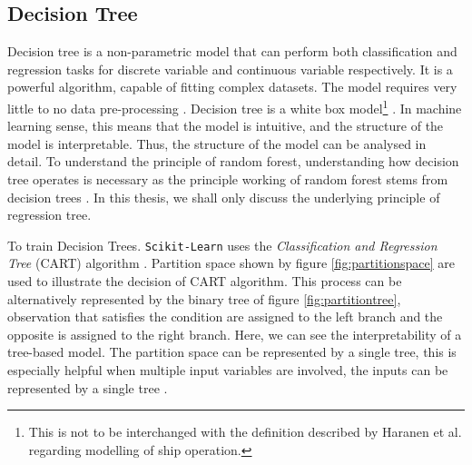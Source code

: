 \subsection{Decision Tree}\label{dt_theo}

Decision tree is a non-parametric model that can perform both classification and regression tasks for discrete variable and continuous variable respectively. It is a powerful algorithm, capable of fitting complex datasets. The model requires very little to no data pre-processing \cite{Geron.2019,Hastie.2009}. Decision tree is a white box model\footnote{This is not to be interchanged with the definition described by Haranen et al. \cite{MichaelHaranen.2016} regarding modelling of ship operation.} \cite{Geron.2019}. In machine learning sense, this means that the model is intuitive, and the structure of the model is interpretable. Thus, the structure of the model can be analysed in detail. To understand the principle of random forest, understanding how decision tree operates is necessary as the principle working of random forest stems from decision trees \cite{Geron.2019,Affenzeller.2020}. In this thesis, we shall only discuss the underlying principle of regression tree.\\  
\newpage

To train Decision Trees. {\tt Scikit-Learn} \cite{FabianPedregosa.2011} uses the \emph{Classification and Regression Tree} (CART) algorithm \cite{Breiman.2017}. Partition space shown by figure \ref{fig:partitionspace} are used to illustrate the decision of CART algorithm. This process can be alternatively represented by the binary tree of figure \ref{fig:partitiontree}, observation that satisfies the condition are assigned to the left branch and the opposite is assigned to the right branch. Here, we can see the interpretability of a tree-based model. The partition space can be represented by a single tree, this is especially helpful when multiple input variables are involved, the inputs can be represented by a single tree \cite{Hastie.2009}.

